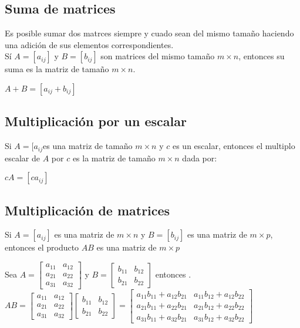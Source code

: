 \subsection{Suma de matrices}
Es posible sumar dos matrces siempre y cuado sean del mismo tamaño haciendo una adici\'on de sus elementos correspondientes.\\
S\'i $A=[a_{ij}]$ y $B=[b_{ij}]$ son matrices del mismo tamaño $m \times n$, entonces su suma es la matriz de tamaño $m \times n$. \\
\begin{center}
$A+B=[a_{ij}+b_{ij}]$
\end{center}
\subsection{Multiplicaci\'on por un escalar}
Si $A=[a_{ij}$es una matriz de tamaño $m \times n$ y $c$ es un escalar, entonces el multiplo escalar de $A$ por $c$ es la matriz de tamaño $m \times n$ dada por:
\begin{center}
$cA=[ca_{ij}]$
\end{center}  
\subsection{Multiplicaci\'on de matrices}
Si $A=[a_{ij}]$ es una matriz de $m \times n$ y $B=[b_{ij}]$ es una matriz de $m \times p$, entonces el producto $AB$ es una matriz de $m \times p$
\begin{center}
Sea $A=\begin{bmatrix}
a_{11} & a_{12}\\
a_{21} & a_{22}\\
a_{31} & a_{32}
\end{bmatrix}$ y $B=\begin{bmatrix}
b_{11} & b_{12}\\
b_{21} & b_{22}
\end{bmatrix}$ entonces \bigskip \bigskip .
$AB=\begin{bmatrix}
a_{11} & a_{12}\\
a_{21} & a_{22}\\
a_{31} & a_{32}
\end{bmatrix}
\begin{bmatrix}
b_{11} & b_{12}\\
b_{21} & b_{22}
\end{bmatrix}=
\begin{bmatrix}
a_{11}b_{11}+a_{12}b_{21} & a_{11}b_{12}+a_{12}b_{22}\\
a_{21}b_{11}+a_{22}b_{21} & a_{21}b_{12}+a_{22}b_{22}\\
a_{31}b_{11}+a_{32}b_{21} & a_{31}b_{12}+a_{32}b_{22}
\end{bmatrix}$
\end{center}
